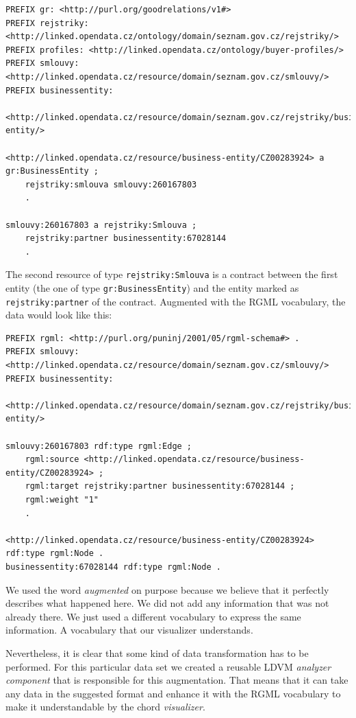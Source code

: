 \begin{verbatim}
PREFIX gr: <http://purl.org/goodrelations/v1#>
PREFIX rejstriky: <http://linked.opendata.cz/ontology/domain/seznam.gov.cz/rejstriky/>
PREFIX profiles: <http://linked.opendata.cz/ontology/buyer-profiles/>
PREFIX smlouvy: <http://linked.opendata.cz/resource/domain/seznam.gov.cz/smlouvy/>
PREFIX businessentity: 
    <http://linked.opendata.cz/resource/domain/seznam.gov.cz/rejstriky/business-entity/>

<http://linked.opendata.cz/resource/business-entity/CZ00283924> a gr:BusinessEntity ;
    rejstriky:smlouva smlouvy:260167803 
    .
        
smlouvy:260167803 a rejstriky:Smlouva ;
    rejstriky:partner businessentity:67028144 
    .
\end{verbatim}

The second resource of type \texttt{rejstriky:Smlouva} is a contract between the first entity (the one of type \texttt{gr:BusinessEntity}) and the entity marked as \texttt{rejstriky:partner} of the contract. Augmented with the RGML vocabulary, the data would look like this:

\begin{verbatim}
PREFIX rgml: <http://purl.org/puninj/2001/05/rgml-schema#> .
PREFIX smlouvy: <http://linked.opendata.cz/resource/domain/seznam.gov.cz/smlouvy/>
PREFIX businessentity: 
    <http://linked.opendata.cz/resource/domain/seznam.gov.cz/rejstriky/business-entity/>

smlouvy:260167803 rdf:type rgml:Edge ;
    rgml:source <http://linked.opendata.cz/resource/business-entity/CZ00283924> ;
    rgml:target rejstriky:partner businessentity:67028144 ;
    rgml:weight "1" 
    .
    
<http://linked.opendata.cz/resource/business-entity/CZ00283924> rdf:type rgml:Node .
businessentity:67028144 rdf:type rgml:Node . 
\end{verbatim}

We used the word \emph{augmented} on purpose because we believe that it perfectly describes what happened here. We did not add any information that was not already there. We just used a different vocabulary to express the same information. A vocabulary that our visualizer understands.

Nevertheless, it is clear that some kind of data transformation has to be performed. For this particular data set we created a reusable LDVM \emph{analyzer component} that is responsible for this augmentation. That means that it can take any data in the suggested format and enhance it with the RGML vocabulary to make it understandable by the chord \emph{visualizer}.
	

